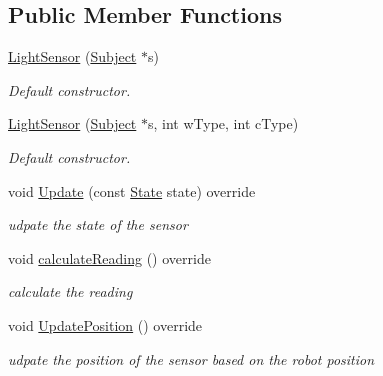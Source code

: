 \subsection*{Public Member Functions}
\begin{DoxyCompactItemize}
\item 
\hyperlink{classLightSensor_aa7ea18f2a99383fe7d4f77ea74259d08}{Light\+Sensor} (\hyperlink{classSubject}{Subject} $\ast$s)\hypertarget{classLightSensor_aa7ea18f2a99383fe7d4f77ea74259d08}{}\label{classLightSensor_aa7ea18f2a99383fe7d4f77ea74259d08}

\begin{DoxyCompactList}\small\item\em Default constructor. \end{DoxyCompactList}\item 
\hyperlink{classLightSensor_af52a3172ca7de3921249f1a0bfd92c3e}{Light\+Sensor} (\hyperlink{classSubject}{Subject} $\ast$s, int w\+Type, int c\+Type)\hypertarget{classLightSensor_af52a3172ca7de3921249f1a0bfd92c3e}{}\label{classLightSensor_af52a3172ca7de3921249f1a0bfd92c3e}

\begin{DoxyCompactList}\small\item\em Default constructor. \end{DoxyCompactList}\item 
void \hyperlink{classLightSensor_a528ac3be8f0881fcdef28bfa2660f10d}{Update} (const \hyperlink{structState}{State} state) override
\begin{DoxyCompactList}\small\item\em udpate the state of the sensor \end{DoxyCompactList}\item 
void \hyperlink{classLightSensor_aebba8c2d9442d15b6cf80966a4c5bf77}{calculate\+Reading} () override\hypertarget{classLightSensor_aebba8c2d9442d15b6cf80966a4c5bf77}{}\label{classLightSensor_aebba8c2d9442d15b6cf80966a4c5bf77}

\begin{DoxyCompactList}\small\item\em calculate the reading \end{DoxyCompactList}\item 
void \hyperlink{classLightSensor_a3ae50dca97aa72dd3f9280767ed702f2}{Update\+Position} () override\hypertarget{classLightSensor_a3ae50dca97aa72dd3f9280767ed702f2}{}\label{classLightSensor_a3ae50dca97aa72dd3f9280767ed702f2}

\begin{DoxyCompactList}\small\item\em udpate the position of the sensor based on the robot position \end{DoxyCompactList}\end{DoxyCompactItemize}
